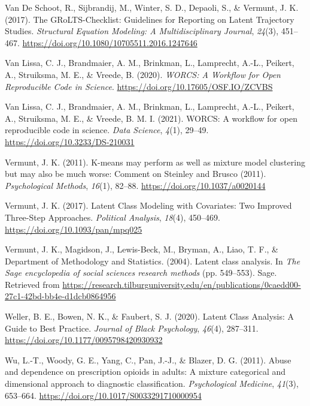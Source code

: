 \documentclass[
  ,man,floatsintext]{apa6}
\newlength{\cslhangindent}
\newlength{\cslentryspacingunit} %
\newenvironment{CSLReferences}[2] %
 {%
  \setlength{\parindent}{0pt}
  \ifodd #1
  \let\oldpar\par
  \def\par{\hangindent=\cslhangindent\oldpar}
  \fi
  \setlength{\parskip}{#2\cslentryspacingunit}
 }%
 {}
\begin{document}
\begin{CSLReferences}{1}{0}
\leavevmode{}%
Van De Schoot, R., Sijbrandij, M., Winter, S. D., Depaoli, S., \& Vermunt, J. K. (2017). The {GRoLTS}-{Checklist}: {Guidelines} for {Reporting} on {Latent} {Trajectory} {Studies}. \emph{Structural Equation Modeling: A Multidisciplinary Journal}, \emph{24}(3), 451--467. \url{https://doi.org/10.1080/10705511.2016.1247646}

\leavevmode{}%
Van Lissa, C. J., Brandmaier, A. M., Brinkman, L., Lamprecht, A.-L., Peikert, A., Struiksma, M. E., \& Vreede, B. (2020). \emph{{WORCS}: {A} {Workflow} for {Open} {Reproducible} {Code} in {Science}}. \url{https://doi.org/10.17605/OSF.IO/ZCVBS}

\leavevmode{}%
Van Lissa, C. J., Brandmaier, A. M., Brinkman, L., Lamprecht, A.-L., Peikert, A., Struiksma, M. E., \& Vreede, B. M. I. (2021). {WORCS}: {A} workflow for open reproducible code in science. \emph{Data Science}, \emph{4}(1), 29--49. \url{https://doi.org/10.3233/DS-210031}

\leavevmode{}%
Vermunt, J. K. (2011). K-means may perform as well as mixture model clustering but may also be much worse: {Comment} on {Steinley} and {Brusco} (2011). \emph{Psychological Methods}, \emph{16}(1), 82--88. \url{https://doi.org/10.1037/a0020144}

\leavevmode{}%
Vermunt, J. K. (2017). Latent {Class} {Modeling} with {Covariates}: {Two} {Improved} {Three}-{Step} {Approaches}. \emph{Political Analysis}, \emph{18}(4), 450--469. \url{https://doi.org/10.1093/pan/mpq025}

\leavevmode{}%
Vermunt, J. K., Magidson, J., Lewis-Beck, M., Bryman, A., Liao, T. F., \& Department of Methodology and Statistics. (2004). Latent class analysis. In \emph{The {Sage} encyclopedia of social sciences research methods} (pp. 549--553). Sage. Retrieved from \url{https://research.tilburguniversity.edu/en/publications/0caedd00-27c1-42bd-bb4e-d1dcb0864956}

\leavevmode{}%
Weller, B. E., Bowen, N. K., \& Faubert, S. J. (2020). Latent {Class} {Analysis}: {A} {Guide} to {Best} {Practice}. \emph{Journal of Black Psychology}, \emph{46}(4), 287--311. \url{https://doi.org/10.1177/0095798420930932}

\leavevmode{}%
Wu, L.-T., Woody, G. E., Yang, C., Pan, J.-J., \& Blazer, D. G. (2011). Abuse and dependence on prescription opioids in adults: A mixture categorical and dimensional approach to diagnostic classification. \emph{Psychological Medicine}, \emph{41}(3), 653--664. \url{https://doi.org/10.1017/S0033291710000954}

\end{CSLReferences}
\end{document}

